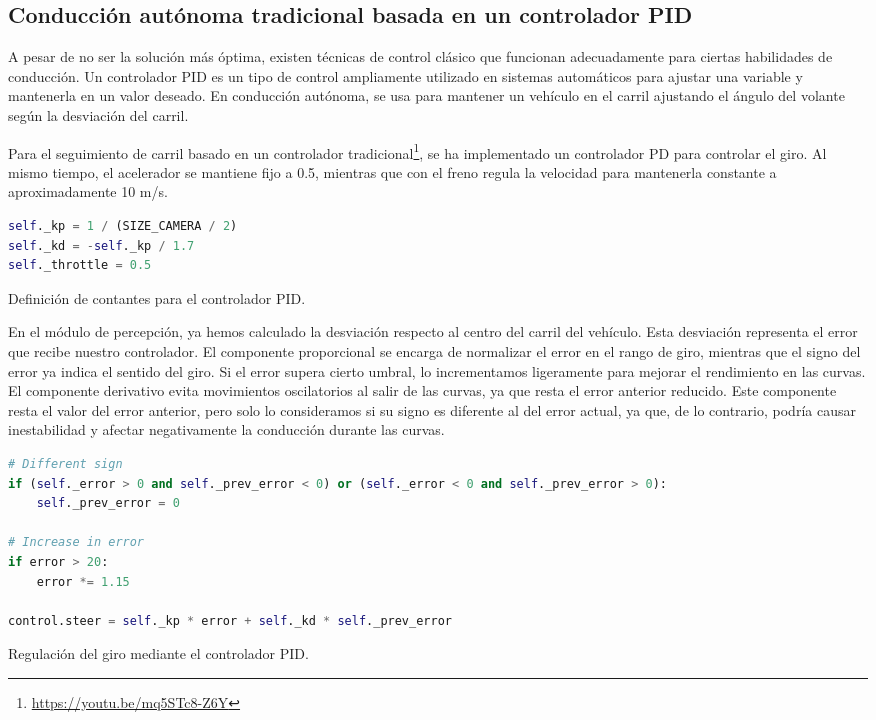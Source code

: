 \subsection{Conducción autónoma tradicional basada en un controlador \ac{PID}}

A pesar de no ser la solución más óptima, existen técnicas de control clásico que funcionan adecuadamente para ciertas habilidades de conducción. Un controlador \ac{PID} es un tipo de control ampliamente utilizado en sistemas automáticos para ajustar una variable y mantenerla en un valor deseado. En conducción autónoma, se usa para mantener un vehículo en el carril ajustando el ángulo del volante según la desviación del carril.

Para el seguimiento de carril basado en un controlador tradicional\footnote{\url{https://youtu.be/mq5STc8-Z6Y}}, se ha implementado un controlador PD para controlar el giro. Al mismo tiempo, el acelerador se mantiene fijo a 0.5, mientras que con el freno regula la velocidad para mantenerla constante a aproximadamente 10 m/s.
\begin{code}[h]
\begin{lstlisting}[language=Python]
self._kp = 1 / (SIZE_CAMERA / 2)
self._kd = -self._kp / 1.7
self._throttle = 0.5
\end{lstlisting}
\caption[Definición de constantes para el controlador \ac{PID}]{Definición de contantes para el controlador \ac{PID}.}
\label{cod:const_pid}
\end{code}

En el módulo de percepción, ya hemos calculado la desviación respecto al centro del carril del vehículo. Esta desviación representa el error que recibe nuestro controlador. El componente proporcional se encarga de normalizar el error en el rango de giro, mientras que el signo del error ya indica el sentido del giro. Si el error supera cierto umbral, lo incrementamos ligeramente para mejorar el rendimiento en las curvas. El componente derivativo evita movimientos oscilatorios al salir de las curvas, ya que resta el error anterior reducido. Este componente resta el valor del error anterior, pero solo lo consideramos si su signo es diferente al del error actual, ya que, de lo contrario, podría causar inestabilidad y afectar negativamente la conducción durante las curvas.
\begin{code}[h]
\begin{lstlisting}[language=Python]
# Different sign
if (self._error > 0 and self._prev_error < 0) or (self._error < 0 and self._prev_error > 0):
    self._prev_error = 0       

# Increase in error
if error > 20:
    error *= 1.15

control.steer = self._kp * error + self._kd * self._prev_error
\end{lstlisting}
\caption[Regulación del giro mediante el controlador \ac{PID}]{Regulación del giro mediante el controlador \ac{PID}.}
\label{cod:pid_giro}
\end{code}


